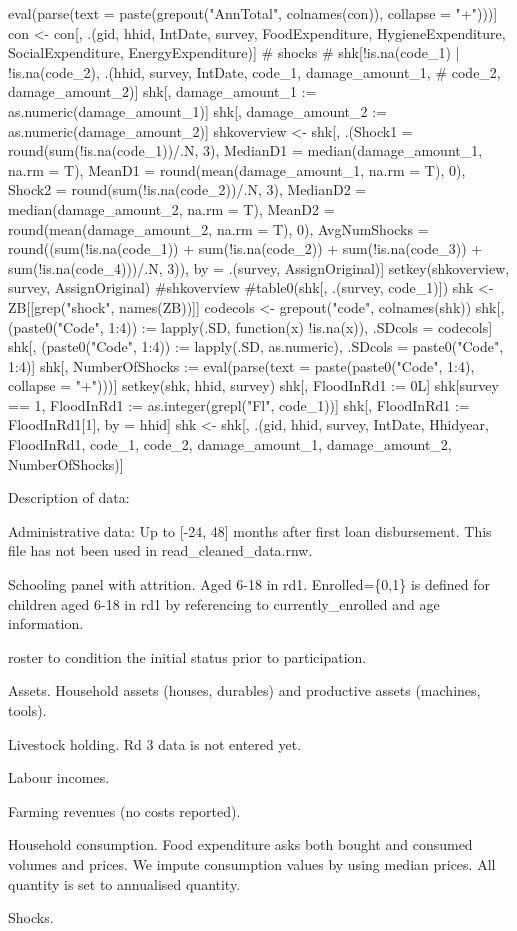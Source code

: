\begin{Schunk}
\begin{Sinput}
  eval(parse(text = paste(grepout("AnnTotal", colnames(con)), collapse = "+")))]
con <- con[, .(gid, hhid, 
  IntDate, survey, FoodExpenditure, HygieneExpenditure, 
  SocialExpenditure, EnergyExpenditure)]
# shocks
# shk[!is.na(code_1) | !is.na(code_2), .(hhid, survey, IntDate, code_1, damage_amount_1, 
#   code_2, damage_amount_2)]
shk[, damage_amount_1 := as.numeric(damage_amount_1)]
shk[, damage_amount_2 := as.numeric(damage_amount_2)]
shkoverview <- shk[, .(Shock1 = round(sum(!is.na(code_1))/.N, 3), 
  MedianD1 = median(damage_amount_1, na.rm = T), 
  MeanD1 = round(mean(damage_amount_1, na.rm = T), 0), 
  Shock2 = round(sum(!is.na(code_2))/.N, 3), 
  MedianD2 = median(damage_amount_2, na.rm = T),
  MeanD2 = round(mean(damage_amount_2, na.rm = T), 0),
  AvgNumShocks = round((sum(!is.na(code_1)) + sum(!is.na(code_2)) + 
    sum(!is.na(code_3)) + sum(!is.na(code_4)))/.N, 3)), 
  by = .(survey, AssignOriginal)]
setkey(shkoverview, survey, AssignOriginal)
#shkoverview
#table0(shk[, .(survey, code_1)])
shk <- ZB[[grep("shock", names(ZB))]]
codecols <- grepout("code", colnames(shk))
shk[, (paste0("Code", 1:4)) := lapply(.SD, function(x) !is.na(x)), .SDcols = codecols]
shk[, (paste0("Code", 1:4)) := lapply(.SD, as.numeric), .SDcols = paste0("Code", 1:4)]
shk[, NumberOfShocks := eval(parse(text = paste(paste0("Code", 1:4), collapse = "+")))]
setkey(shk, hhid, survey)
shk[, FloodInRd1 := 0L]
shk[survey == 1, FloodInRd1 := as.integer(grepl("Fl", code_1))]
shk[, FloodInRd1 := FloodInRd1[1], by = hhid]
shk <- shk[, .(gid, hhid, survey, IntDate, Hhidyear, FloodInRd1, code_1, code_2, 
  damage_amount_1, damage_amount_2, NumberOfShocks)]
\end{Sinput}
\end{Schunk}

Description of data:
\begin{description}
\vspace{1.0ex}\setlength{\itemsep}{1.0ex}\setlength{\baselineskip}{12pt}
\item[ad]	Administrative data: Up to [-24, 48] months after first loan disbursement. This file has not been used in \textsf{read\_cleaned\_data.rnw}.
\item[sch1]	Schooling panel with attrition. Aged 6-18 in rd1. \textsf{Enrolled=\{0,1\}} is defined for children aged 6-18 in rd1 by referencing to \textsf{currently\_enrolled} and age information.
\item[ros]	 \textsf{roster} to condition the initial status prior to participation.
\item[ass]	 Assets. Household assets (houses, durables) and productive assets (machines, tools). 
\item[lvo]	Livestock holding. Rd 3 data is not entered yet.
\item[lab]	Labour incomes.
\item[far]	Farming revenues (no costs reported).
\item[con]	Household consumption. Food expenditure asks both bought and consumed volumes and prices. We impute consumption values by using median prices. All quantity is set to annualised quantity.
\item[shk]	Shocks. 
\end{description}

